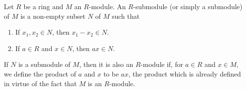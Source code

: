 Let $R$ be a ring and $M$ an $R$-module. An $R$-submodule (or simply a submodule) of $M$ is a non-empty subset $N$ of $M$ such that

\begin{enumerate}
\item[(a)] If $x_1, x_2 \in N$, then $x_1 - x_2 \in N$.
\item[(b)] If $a \in R$ and $x \in N$, then $ax \in N$.
\end{enumerate}

If $N$ is a submodule of $M$, then it is also an $R$-module if, for $a \in R$ and $x \in M$, we define the product of $a$ and $x$ to be $ax$, the product which is already defined in virtue of the fact that $M$ is an $R$-module.
